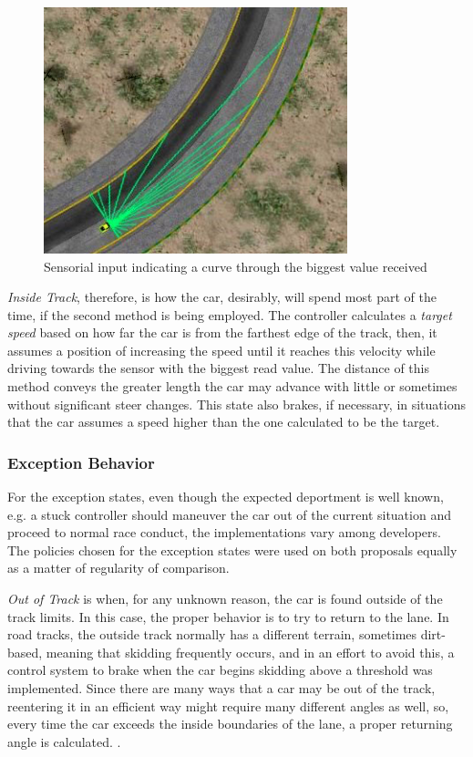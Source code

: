 	\begin{figure}[h]
		
		\centering
		\includegraphics[width=250pt]{FarthestSensor}
		\caption{Sensorial input indicating a curve through the biggest value received}
		\label{Fig:FSensor}
		
	\end{figure}
	
	\emph{Inside Track}, therefore, is how the car, desirably, will spend most part of the time, if the second method is being employed. The controller calculates a \emph{target speed} based on how far the car is from the farthest edge of the track, then, it assumes a position of increasing the speed until it reaches this velocity while driving towards the sensor with the biggest read value. The distance of this method conveys the greater length the car may advance with little or sometimes without significant steer changes. This state also brakes, if necessary, in situations that the car assumes a speed higher than the one calculated to be the target.
	
\subsubsection{Exception Behavior}
	
	For the exception states, even though the expected deportment is well known, e.g. a stuck controller should maneuver the car out of the current situation and proceed to normal race conduct, the implementations vary among developers. The policies chosen for the exception states were used on both proposals equally as a matter of regularity of comparison.
	
	\emph{Out of Track} is when, for any unknown reason, the car is found outside of the track limits. In this case, the proper behavior is to try to return to the lane. In road tracks, the outside track normally has a different terrain, sometimes dirt-based, meaning that skidding frequently occurs, and in an effort to avoid this, a control system to brake when the car begins skidding above a threshold was implemented. Since there are many ways that a car may be out of the track, reentering it in an efficient way might require many different angles as well, so, every time the car exceeds the inside boundaries of the lane, a proper returning angle is calculated. .
	
